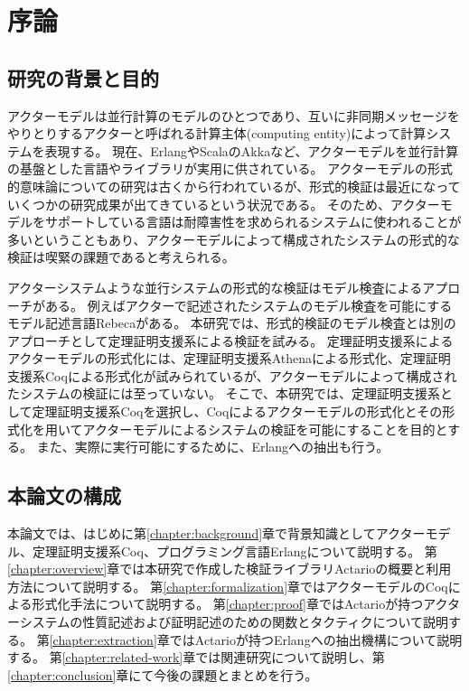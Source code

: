 \chapter{序論}
\label{chapter:intro}

\section{研究の背景と目的}
アクターモデル\cite{Agha:1986aa}は並行計算のモデルのひとつであり、互いに非同期メッセージをやりとりするアクターと呼ばれる計算主体(computing entity)によって計算システムを表現する。
現在、Erlang\cite{Erlang}やScala\cite{Scala}のAkka\cite{Akka}など、アクターモデルを並行計算の基盤とした言語やライブラリが実用に供されている。
アクターモデルの形式的意味論についての研究は古くから行われているが、形式的検証は最近になっていくつかの研究成果が出てきているという状況である。
そのため、アクターモデルをサポートしている言語は耐障害性を求められるシステムに使われることが多いということもあり、アクターモデルによって構成されたシステムの形式的な検証は喫緊の課題であると考えられる。

アクターシステムような並行システムの形式的な検証はモデル検査によるアプローチがある。
例えばアクターで記述されたシステムのモデル検査を可能にするモデル記述言語Rebeca\cite{Sirjani:2011aa}がある。
本研究では、形式的検証のモデル検査とは別のアプローチとして定理証明支援系による検証を試みる。
定理証明支援系によるアクターモデルの形式化には、定理証明支援系Athenaによる形式化\cite{Musser:2013aa}、定理証明支援系Coqによる形式化\cite{Garnock-Jones:2014aa}が試みられているが、アクターモデルによって構成されたシステムの検証には至っていない。
そこで、本研究では、定理証明支援系として定理証明支援系Coqを選択し、Coqによるアクターモデルの形式化とその形式化を用いてアクターモデルによるシステムの検証を可能にすることを目的とする。
また、実際に実行可能にするために、Erlangへの抽出も行う。


\section{本論文の構成}
本論文では、はじめに第\ref{chapter:background}章で背景知識としてアクターモデル、定理証明支援系Coq、プログラミング言語Erlangについて説明する。
第\ref{chapter:overview}章では本研究で作成した検証ライブラリActarioの概要と利用方法について説明する。
第\ref{chapter:formalization}章ではアクターモデルのCoqによる形式化手法について説明する。
第\ref{chapter:proof}章ではActarioが持つアクターシステムの性質記述および証明記述のための関数とタクティクについて説明する。
第\ref{chapter:extraction}章ではActarioが持つErlangへの抽出機構について説明する。
第\ref{chapter:related-work}章では関連研究について説明し、第\ref{chapter:conclusion}章にて今後の課題とまとめを行う。
